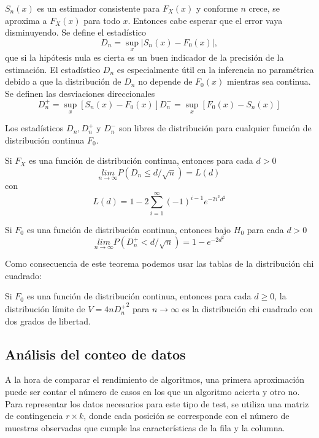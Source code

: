 	$S_n(x)$ es un estimador consistente para $F_X(x)$ y conforme $n$ crece, se aproxima a $F_X(x)$ para todo $x$. Entonces cabe esperar que el error vaya disminuyendo. Se define el estadístico
	\[ D_n = \underset{x}{\sup} 
				\vert S_n(x) - F_0(x) \vert, \]
	que si la hipótesis nula es cierta es un buen indicador de la precisión de la estimación. El estadístico $D_n$ es especialmente útil en la inferencia no paramétrica debido a que la distribución de $D_n$ no depende de $F_0(x)$ mientras sea continua. Se definen las desviaciones direccionales
	\[ D_n^+ = \underset{x}{\sup} [S_n(x) - F_0(x)]
		D_n^- = \underset{x}{\sup} [F_0(x) - S_n(x)]\]
	
\begin{teorema}
	Los estadísticos $D_n, D_n^+$ y $D_n^-$ son libres de distribución para cualquier función de distribución continua $F_0$.
\end{teorema}
	
\begin{teorema}
	Si $F_X$ es una función de distribución continua, entonces para cada $d>0$
	\[ \underset{n \rightarrow \infty}{lim}
			P(D_n \leq d/\sqrt{n}) = L(d) \]
	con
	\[ L(d) = 1 - 2 \sum\limits_{i=1}^\infty 
			(-1)^{i-1} e^{-2i^2d^2}	\]
\end{teorema}

\begin{teorema}
	Si $F_0$ es una función de distribución continua, entonces bajo $H_0$ para cada $d>0$
	\[ \underset{n \rightarrow \infty}{lim}
			P(D_n^+ < d/\sqrt{n}) = 1-e^{-2d^2} \]
\end{teorema}	
	Como consecuencia de este teorema podemos usar las tablas de la distribución chi cuadrado:
	
\begin{corolario}
	Si $F_0$ es una función de distribución continua, entonces para cada $d \geq 0$, la distribución límite de $V = 4n {D_n^+}^2$ para $n \rightarrow \infty$ es la distribución chi cuadrado con dos grados de libertad.
\end{corolario}	
	
\subsection{Análisis del conteo de datos}
	
	A la hora de comparar el rendimiento de algoritmos, una primera aproximación puede ser contar el número de casos en los que un algoritmo acierta y otro no. Para representar los datos necesarios para este tipo de test, se utiliza una matriz de contingencia $r \times k$, donde cada posición se corresponde con el número de muestras observadas que cumple las características de la fila y la columna.
	
